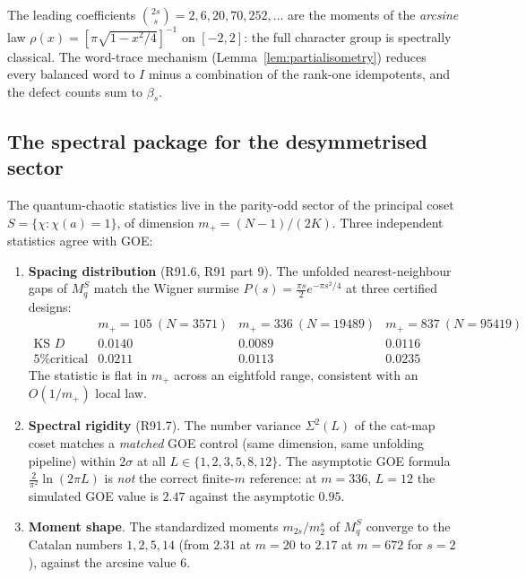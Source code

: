 The leading coefficients $\binom{2s}{s} = 2, 6, 20, 70, 252, \dots$ are the
moments of the \emph{arcsine} law $\rho(x) = [\pi\sqrt{1 - x^2/4}]^{-1}$ on
$[-2,2]$: the full character group is spectrally classical.  The word-trace
mechanism (Lemma~\ref{lem:partialisometry}) reduces every balanced word to
$I$ minus a combination of the rank-one idempotents, and the defect counts
sum to $\beta_s$.

\subsection{The spectral package for the desymmetrised sector}
\label{sec:spectralpackage}

The quantum-chaotic statistics live in the parity-odd sector of the
principal coset $S = \{\chi : \chi(a) = 1\}$, of dimension
$m_+ = (N{-}1)/(2K)$.  Three independent statistics agree with GOE:

\begin{enumerate}
\item \textbf{Spacing distribution} (R91.6, R91 part 9).  The unfolded
nearest-neighbour gaps of $M_q^{S}$ match the Wigner surmise
$P(s) = \tfrac{\pi s}{2} e^{-\pi s^2/4}$ at three certified designs:
\[
\begin{array}{lccc}
 & m_+ = 105\ (N{=}3571) & m_+ = 336\ (N{=}19489) & m_+ = 837\ (N{=}95419)\\
\text{KS } D & 0.0140 & 0.0089 & 0.0116\\
\text{5\% critical} & 0.0211 & 0.0113 & 0.0235
\end{array}
\]
The statistic is flat in $m_+$ across an eightfold range, consistent with
an $O(1/m_+)$ local law.

\item \textbf{Spectral rigidity} (R91.7).  The number variance
$\Sigma^2(L)$ of the cat-map coset matches a \emph{matched} GOE control
(same dimension, same unfolding pipeline) within $2\sigma$ at all
$L \in \{1,2,3,5,8,12\}$.  The asymptotic GOE formula
$\tfrac{2}{\pi^2}\ln(2\pi L)$ is \emph{not} the correct finite-$m$
reference: at $m = 336$, $L = 12$ the simulated GOE value is $2.47$
against the asymptotic $0.95$.

\item \textbf{Moment shape}.  The standardized moments
$m_{2s}/m_2^s$ of $M_q^S$ converge to the Catalan numbers $1, 2, 5, 14$
(from $2.31$ at $m = 20$ to $2.17$ at $m = 672$ for $s = 2$), against the
arcsine value $6$.
\end{enumerate}

